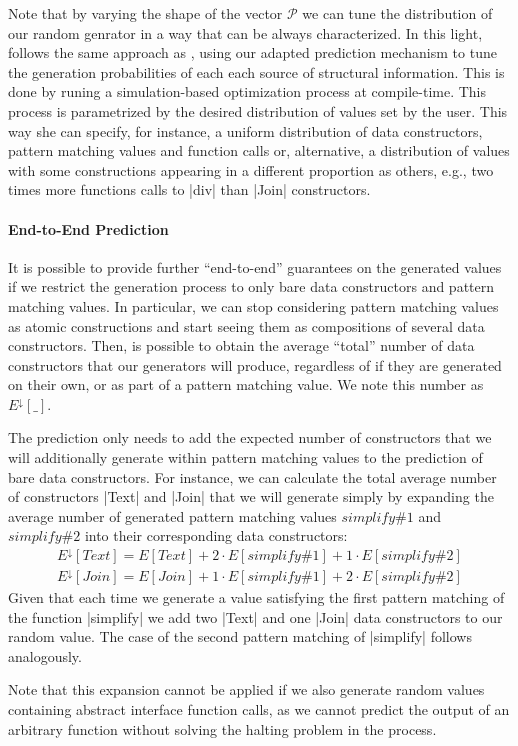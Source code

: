 Note that by varying the shape of the vector $\mathcal{P}$ we can tune the
distribution of our random genrator in a way that can be always characterized.
%
In this light, \dragenp follows the same approach as \dragen, using our adapted
prediction mechanism to tune the generation probabilities of each each source of
structural information.
%
This is done by runing a simulation-based optimization process at compile-time.
%
This process is parametrized by the desired distribution of values set by the
user.
%
This way she can specify, for instance, a uniform distribution of data
constructors, pattern matching values and function calls or, alternative, a
distribution of values with some constructions appearing in a different
proportion as others, e.g., two times more functions calls to |div| than |Join|
constructors.


\paragraph{End-to-End Prediction}
%

It is possible to provide further ``end-to-end'' guarantees on the generated
values if we restrict the generation process to only bare data constructors and
pattern matching values.
%
In particular, we can stop considering pattern matching values as atomic
constructions and start seeing them as compositions of several data
constructors.
%
Then, is possible to obtain the average ``total'' number of data constructors
that our generators will produce, regardless of if they are generated on their
own, or as part of a pattern matching value.
%
We note this number as $E^\downarrow\![\_]$.


The prediction only needs to add the expected number of constructors that we
will additionally generate within pattern matching values to the prediction of
bare data constructors.
%
For instance, we can calculate the total average number of constructors |Text|
and |Join| that we will generate simply by expanding the average number of
generated pattern matching values $simplify\#1$ and $simplify\#2$ into their
corresponding data constructors:
%
{\small
  \begin{align*}
    E^\downarrow\!\!\left[ Text \right]
    = E\left[ Text \right]
    + 2\! \cdot\!\! E\!\left[ simplify\#1 \right]
    + 1\!\! \cdot\!\! E\!\left[ simplify\#2 \right] \\
    E^\downarrow\!\!\left[ Join \right]
    = E\left[ Join \right]
    + 1\!\! \cdot\!\! E\!\left[ simplify\#1 \right]
    + 2\! \cdot\!\! E\!\left[ simplify\#2 \right]
  \end{align*}
}
%
Given that each time we generate a value satisfying the first pattern matching
of the function |simplify| we add two |Text| and one |Join| data constructors to
our random value.
%
The case of the second pattern matching of |simplify| follows analogously.


Note that this expansion cannot be applied if we also generate random values
containing abstract interface function calls, as we cannot predict the output of
an arbitrary function without solving the halting problem in the process.
